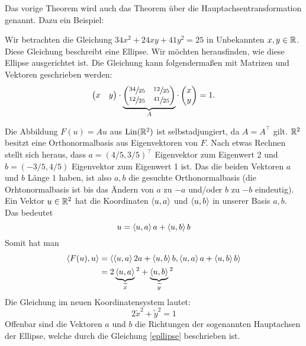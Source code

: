 	Das vorige Theorem wird auch das Theorem über die Hauptachsentransformation genannt. Dazu ein Beispiel:

\begin{bsp}	
	Wir betrachten die Gleichung $ 34x^2 + 24xy + 41 y^2 = 25 $ in Unbekannten $ x,y \in \mathbb R $. Diese Gleichung beschreibt eine Ellipse. Wir möchten herausfinden, wie diese Ellipse ausgerichtet ist. Die Gleichung kann folgendermaßen mit Matrizen und Vektoren geschrieben werden: 
	\begin{equation}
		\begin{pmatrix}
			x & y
		\end{pmatrix} \cdot
		\underbrace{\begin{pmatrix}
			\sfrac{34}{25} & \sfrac{12}{25} \\
			\sfrac{12}{25} & \sfrac{41}{25}
		\end{pmatrix}}_{A}
		\cdot \begin{pmatrix}
			x \\ y
		\end{pmatrix} = 1.
		\label{epllipse} 
	\end{equation}
	
	Die Abbildung $ F(u) = Au $ aus $ \operatorname{Lin}(\mathbb R^2) $ ist selbstadjungiert, da $ A = A^\top $ gilt.
	$ \mathbb R^2 $ besitzt eine Orthonormalbasis aus Eigenvektoren von $ F $. Nach etwas Rechnen stellt sich heraus, dass $ a = (4/5, 3/5)^\top $ Eigenvektor zum Eigenwert 2 und $ b = (-3/5, 4/5) $ Eigenvektor zum Eigenwert 1 ist. Das die beiden Vektoren $a$ und $b$ Länge $1$ haben, ist also $ a,b $ die gesuchte Orthonormalbasis (die Orhtonormalbasis ist bis das Ändern von $a$ zu $-a$ und/oder $b$ zu $-b$ eindeutig). Ein Vektor $u \in \mathbb R^2$ hat die Koordinaten $\left\langle u,a \right\rangle$ und $\left\langle u,b \right\rangle$ in unserer Basis $a,b$. Das bedeutet 
	\[ u = \left\langle u,a \right\rangle a + \left\langle u,b \right\rangle b 
	\] 
	Somit hat man 
	\begin{align*}
		\left\langle F(u),u \right\rangle &= \left\langle \left\langle u,a \right\rangle2a + \left\langle u,b \right\rangle b,\left\langle u,a \right\rangle a + \left\langle u,b \right\rangle b \right\rangle \\
		&= 2\underbrace{ \left\langle u,a \right\rangle}_{\widetilde{x}}{}^2 + \underbrace{\left\langle u,b \right\rangle}_{\widetilde{y}}{}^2
	\end{align*}
	Die Gleichung im neuen Koordinatensystem lautet:
	\begin{equation*}
		2\widetilde{x}^2 + \widetilde{y}^2 = 1
	\end{equation*}
	Offenbar sind die Vektoren $ a $ und $ b $ die Richtungen der sogenannten Hauptachsen der Ellipse, welche durch die Gleichung \eqref{epllipse} beschrieben ist. 
\end{bsp}


